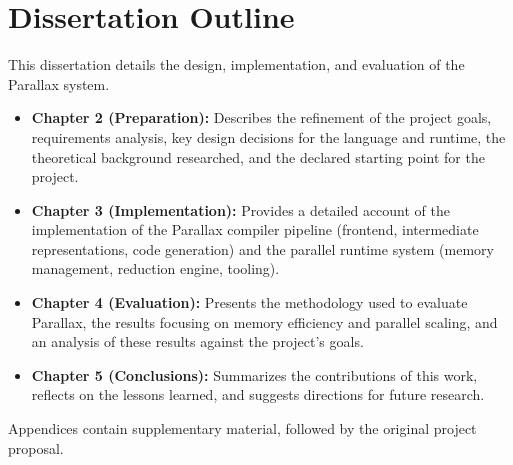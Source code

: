 
\section{Dissertation Outline}
This dissertation details the design, implementation, and evaluation of the Parallax system. 
\begin{itemize}
    \item \textbf{Chapter 2 (Preparation):} Describes the refinement of the project goals, requirements analysis, key design decisions for the language and runtime, the theoretical background researched, and the declared starting point for the project.
    \item \textbf{Chapter 3 (Implementation):} Provides a detailed account of the implementation of the Parallax compiler pipeline (frontend, intermediate representations, code generation) and the parallel runtime system (memory management, reduction engine, tooling).
    \item \textbf{Chapter 4 (Evaluation):} Presents the methodology used to evaluate Parallax, the results focusing on memory efficiency and parallel scaling, and an analysis of these results against the project's goals.
    \item \textbf{Chapter 5 (Conclusions):} Summarizes the contributions of this work, reflects on the lessons learned, and suggests directions for future research.
\end{itemize}
Appendices contain supplementary material, followed by the original project proposal.
